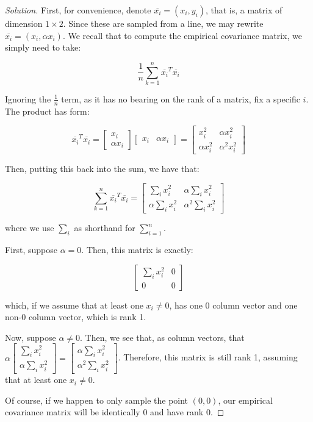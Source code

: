 \documentclass[10pt]{article}
\begin{document}
\begin{proof}[Solution]

First, for convenience, denote $\overline{x_i} = (x_i, y_i)$, that is, a matrix of dimension $1 \times 2$. Since these are sampled from a line, we may rewrite $\overline{x_i} = (x_i, \alpha x_i)$. We recall that to compute the empirical covariance matrix, we simply need to take:

$$ \frac{1}{n} \sum_{k=1}^n  \overline{x_i}^T \overline{x_i}$$

Ignoring the $\frac{1}{n}$ term, as it has no bearing on the rank of a matrix, fix a specific $i$. The product has form:

$$  \overline{x_i}^T \overline{x_i} = \begin{bmatrix} x_i \\ \alpha x_i \end{bmatrix} \begin{bmatrix} x_i  & \alpha x_i \end{bmatrix} = \begin{bmatrix} x_i^2 & \alpha x_i^2 \\ \alpha x_i^2 & \alpha^2 x_i^2 \end{bmatrix} $$

Then, putting this back into the sum, we have that:

$$ \sum_{k=1}^n  \overline{x_i}^T \overline{x_i} = \begin{bmatrix} \sum_{i} x_i^2 & \alpha \sum_i x_i^2 \\ \alpha\sum_i x_i^2 & \alpha^2 \sum_i x_i^2 \end{bmatrix} $$

where we use $\sum_i$ as shorthand for $\sum_{i=1}^n$. 

First, suppose $\alpha = 0$. Then, this matrix is exactly:

$$ \begin{bmatrix} \sum_i x_i^2 & 0 \\ 0 & 0 \end{bmatrix} $$

which, if we assume that at least one $x_i \not = 0$, has one 0 column vector and one non-0 column vector, which is rank 1.

Now, suppose $\alpha \not = 0$. Then, we see that, as column vectors, that $\alpha \begin{bmatrix}  \sum_{i} x_i^2 \\ \alpha \sum_i x_i^2  \end{bmatrix} = \begin{bmatrix} \alpha  \sum_i x_i^2 \\ \alpha^2 \sum_i x_i^2 \end{bmatrix}$. Therefore, this matrix is still rank 1, assuming that at least one $x_i \not = 0$.

Of course, if we happen to only sample the point $(0,0)$, our empirical covariance matrix will be identically 0 and have rank 0.


\end{proof}
\end{document}
